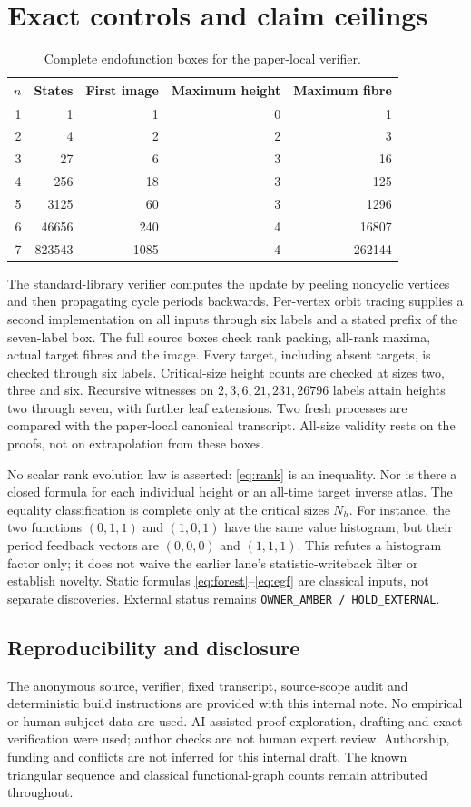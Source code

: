 \documentclass[a4paper,10pt]{amsart}
\theoremstyle{remark}
\begin{document}
\section{Exact controls and claim ceilings}
\begin{table}[ht]
\centering
\caption{Complete endofunction boxes for the paper-local verifier.}
\begin{tabular}{rrrrr}
\toprule
$n$ & States & First image & Maximum height & Maximum fibre\\
\midrule
1 & 1 & 1 & 0 & 1\\
2 & 4 & 2 & 2 & 3\\
3 & 27 & 6 & 3 & 16\\
4 & 256 & 18 & 3 & 125\\
5 & 3125 & 60 & 3 & 1296\\
6 & 46656 & 240 & 4 & 16807\\
7 & 823543 & 1085 & 4 & 262144\\
\bottomrule
\end{tabular}
\end{table}
The standard-library verifier computes the update by peeling noncyclic
vertices and then propagating cycle periods backwards. Per-vertex orbit
tracing supplies a second implementation on all inputs through six
labels and a stated prefix of the seven-label box. The full source boxes
check rank packing, all-rank maxima, actual target fibres and the image.
Every target, including absent targets, is checked through six labels.
Critical-size height counts are checked at sizes two, three and six.
Recursive witnesses on $2,3,6,21,231,26796$ labels attain heights two
through seven, with further leaf extensions. Two fresh processes are
compared with the paper-local canonical transcript. All-size validity
rests on the proofs, not on extrapolation from these boxes.

No scalar rank evolution law is asserted: \eqref{eq:rank} is an
inequality. Nor is there a closed formula for each individual height or
an all-time target inverse atlas. The equality classification is complete
only at the critical sizes $N_h$. For instance, the two functions
$(0,1,1)$ and $(1,0,1)$ have the same value histogram, but their period
feedback vectors are $(0,0,0)$ and $(1,1,1)$. This refutes a histogram
factor only; it does not waive the earlier lane's statistic-writeback
filter or establish novelty. Static formulas \eqref{eq:forest}--\eqref{eq:egf}
are classical inputs, not separate discoveries. External status remains
\texttt{OWNER\_AMBER / HOLD\_EXTERNAL}.

\subsection*{Reproducibility and disclosure}
The anonymous source, verifier, fixed transcript, source-scope audit and
deterministic build instructions are provided with this internal note.
No empirical or human-subject data are used. AI-assisted proof exploration,
drafting and exact verification were used; author checks are not human
expert review. Authorship, funding and conflicts are not inferred for
this internal draft. The known triangular sequence and classical
functional-graph counts remain attributed throughout.


\end{document}
